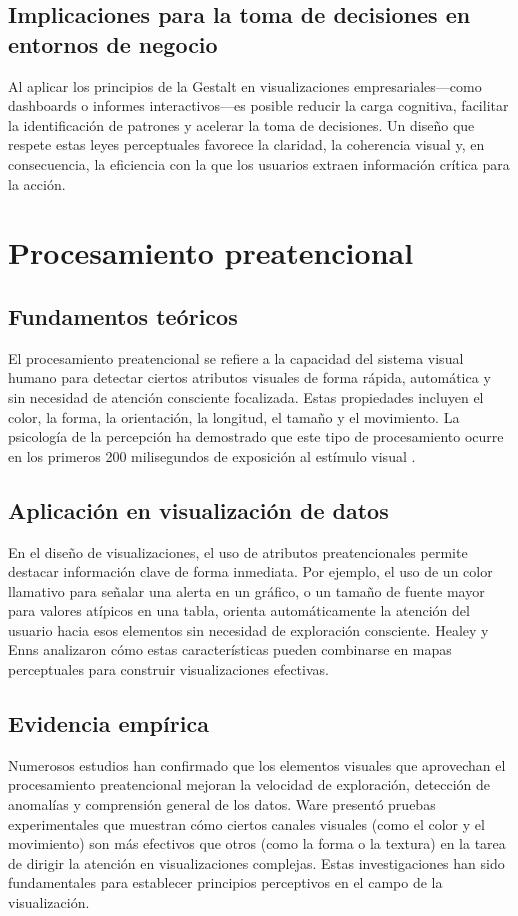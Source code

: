 \documentclass[12pt]{article}
\begin{document}
\subsection{Implicaciones para la toma de decisiones en entornos de negocio}
Al aplicar los principios de la Gestalt en visualizaciones empresariales—como dashboards o informes interactivos—es posible reducir la carga cognitiva, facilitar la identificación de patrones y acelerar la toma de decisiones. Un diseño que respete estas leyes perceptuales favorece la claridad, la coherencia visual y, en consecuencia, la eficiencia con la que los usuarios extraen información crítica para la acción.

\section{Procesamiento preatencional}

\subsection{Fundamentos teóricos}
El procesamiento preatencional se refiere a la capacidad del sistema visual humano para detectar ciertos atributos visuales de forma rápida, automática y sin necesidad de atención consciente focalizada. Estas propiedades incluyen el color, la forma, la orientación, la longitud, el tamaño y el movimiento. La psicología de la percepción ha demostrado que este tipo de procesamiento ocurre en los primeros 200 milisegundos de exposición al estímulo visual \parencite{wolfe1998}.

\subsection{Aplicación en visualización de datos}
En el diseño de visualizaciones, el uso de atributos preatencionales permite destacar información clave de forma inmediata. Por ejemplo, el uso de un color llamativo para señalar una alerta en un gráfico, o un tamaño de fuente mayor para valores atípicos en una tabla, orienta automáticamente la atención del usuario hacia esos elementos sin necesidad de exploración consciente. Healey y Enns \parencite{healey1999} analizaron cómo estas características pueden combinarse en mapas perceptuales para construir visualizaciones efectivas.

\subsection{Evidencia empírica}
Numerosos estudios han confirmado que los elementos visuales que aprovechan el procesamiento preatencional mejoran la velocidad de exploración, detección de anomalías y comprensión general de los datos. Ware \parencite{ware2004} presentó pruebas experimentales que muestran cómo ciertos canales visuales (como el color y el movimiento) son más efectivos que otros (como la forma o la textura) en la tarea de dirigir la atención en visualizaciones complejas. Estas investigaciones han sido fundamentales para establecer principios perceptivos en el campo de la visualización.
\end{document}
